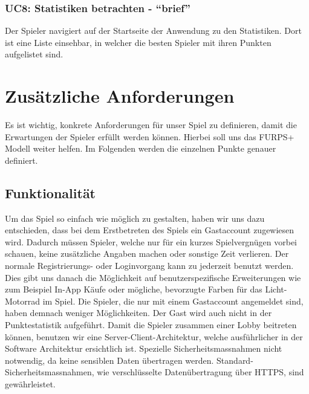 \documentclass[11pt,ngerman]{article}
\newcommand{\quotes}[1]{``#1''}
\begin{document}
        \subsubsection{UC8: Statistiken betrachten - \quotes{brief}}
        \label{sssec:UC8Statistikenbetrachten}
        \begin{tcolorbox}[enhanced, breakable, sharp corners, width=\dimexpr\textwidth-15mm\relax ,enlarge left by=10mm ,fontupper=\linespread{1.1}\selectfont, boxrule=1pt, title={UC8: Statistiken betrachten}, colback=white, colframe=gray!22, coltitle=black]
        	Der Spieler navigiert auf der Startseite der Anwendung zu den Statistiken. Dort ist eine Liste einsehbar, in welcher die besten Spieler mit ihren Punkten aufgelistet sind.
        \end{tcolorbox}

    \section{Zusätzliche Anforderungen}
    	Es ist wichtig, konkrete Anforderungen für unser Spiel zu definieren, damit die Erwartungen der Spieler erfüllt werden können. Hierbei soll uns das FURPS+ Modell weiter helfen. Im Folgenden werden die einzelnen Punkte genauer definiert.
        \subsection{Funktionalität}
        Um das Spiel so einfach wie möglich zu gestalten, haben wir uns dazu entschieden, dass bei dem Erstbetreten des Spiels ein Gastaccount zugewiesen wird. Dadurch müssen Spieler, welche nur für ein kurzes Spielvergnügen vorbei schauen, keine zusätzliche Angaben machen oder sonstige Zeit verlieren. Der normale Registrierungs- oder Loginvorgang kann zu jederzeit benutzt werden. Dies gibt uns danach die Möglichkeit auf benutzerspezifische Erweiterungen wie zum Beispiel In-App Käufe oder mögliche, bevorzugte Farben für das Licht-Motorrad im Spiel. Die Spieler, die nur mit einem Gastaccount angemeldet sind, haben demnach weniger Möglichkeiten. Der Gast wird auch nicht in der Punktestatistik aufgeführt.\newline
        \newline
        Damit die Spieler zusammen einer Lobby beitreten können, benutzen wir eine Server-Client-Architektur, welche ausführlicher in der Software Architektur ersichtlich ist. Spezielle Sicherheitsmassnahmen nicht notwendig, da keine sensiblen Daten übertragen werden. Standard-Sicherheitsmassnahmen, wie verschlüsselte Datenübertragung über HTTPS, sind gewährleistet.
\end{document}
